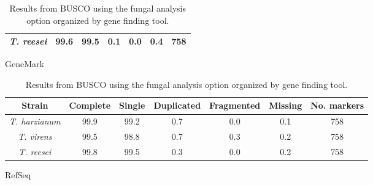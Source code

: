 \begin{table}
\begin{center}
\begin{subtable}{\textwidth}
\begin{tabular}{|c|c|c|c|c|c|c|}
        \textit{T. reesei} & 99.6 & 99.5 & 0.1 & 0.0 & 0.4 & 758 \\ \hline
      \end{tabular}
      \caption{GeneMark}
    \end{subtable}
    \begin{subtable}{\textwidth}
      \centering
      \begin{tabular}{|c|c|c|c|c|c|c|}
        \hline
        Strain & Complete & Single & Duplicated & Fragmented & Missing & No. markers \\ \hline
        \textit{T. harzianum} & 99.9 & 99.2 & 0.7 & 0.0 & 0.1 & 758 \\ \hline
        \textit{T. virens} & 99.5 & 98.8 & 0.7 & 0.3 & 0.2 & 758 \\ \hline
        \textit{T. reesei} & 99.8 & 99.5 & 0.3 & 0.0 & 0.2 & 758 \\ \hline
      \end{tabular}
      \caption{RefSeq}
    \end{subtable}
  \end{center}
  \caption{Results from BUSCO using the fungal analysis option organized by gene finding tool.}
  \label{table:busco}
\end{table}

